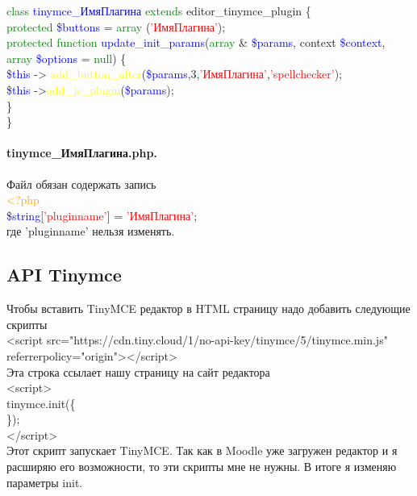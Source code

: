 \documentclass[14pt,Diplom]{diplomwork}
\begin{document}
\textcolor{green}{class} \textcolor{blue}{tinymce\_ИмяПлагина} \textcolor{green}{extends} editor\_tinymce\_plugin \{ \\
\textcolor{green}{protected} \textcolor{blue}{\$buttons} = \textcolor{green}{array} (\textcolor{red}{'ИмяПлагина'}); \\

\textcolor{green}{protected function} \textcolor{blue}{update\_init\_params}(\textcolor{green}{array} \& \textcolor{blue}{\$params}, context \textcolor{blue}{\$context}, \textcolor{green}{array} \textcolor{blue}{\$options} = \textcolor{green}{null}) \{ \\

\textcolor{blue}{\$this} -> \textcolor{yellow}{add\_button\_after}(\textcolor{blue}{\$params},3,\textcolor{red}{'ИмяПлагина'},\textcolor{red}{'spellchecker'});\\

\textcolor{blue}{\$this} ->\textcolor{yellow}{add\_js\_plugin}(\textcolor{blue}{\$params});\\

\}\\
\}\\

\paragraph{tinymce\_ИмяПлагина.php.} 
Файл обязан содержать запись\\
\textcolor{orange}{<?php} \\
\textcolor{blue}{\$string}[\textcolor{red}{'pluginname'}] = \textcolor{red}{'ИмяПлагина'};\\
где 'pluginname' нельзя изменять.

\subsection{API Tinymce}
Чтобы вставить TinyMCE редактор в HTML страницу надо добавить следующие скрипты\\
<script src="https://cdn.tiny.cloud/1/no-api-key/tinymce/5/tinymce.min.js" referrerpolicy="origin"></script>\\
Эта строка ссылает нашу страницу на сайт редактора \\
<script>\\
tinymce.init(\{\\
\});\\
</script>\\
Этот скрипт запускает TinyMCE. Так как в Moodle уже загружен редактор и я расширяю его возможности, то эти скрипты мне не нужны. В итоге я изменяю параметры init.
\end{document}
